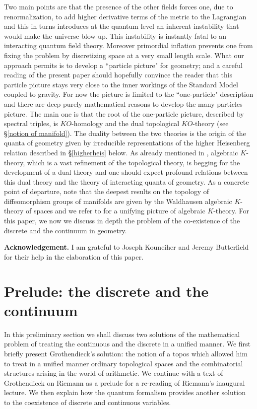 \documentclass[12pt]{article}
\begin{document}
   Two main points are that the presence of the other fields forces one, due to renormalization,  to add higher derivative terms of the metric to the Lagrangian and this in turns introduces at the quantum level an inherent instability  that would make the universe blow up. This instability is instantly fatal to an interacting quantum field theory. Moreover primordial inflation prevents one from fixing the problem by discretizing space at a very small length scale. What our approach permits is to develop a ``particle picture" for geometry; and a careful reading of the present paper should hopefully convince the reader that this particle picture stays very close to the inner workings of the Standard Model coupled to gravity. For now the picture is limited to the ``one-particle" description and there are deep purely mathematical reasons to develop the many particles picture. The main one is that the root of the one-particle picture, described by spectral triples, is $KO$-homology and the dual topological $KO$-theory (see \S \ref{notion of manifold}). The duality between the two theories is the origin of the quanta of geometry given by irreducible representations of the higher Heisenberg relation described in \S \ref{higherheis} below. As already mentioned in \cite{coinaugural}, algebraic $K$-theory, which is a vast refinement of the topological theory,  is begging for the development of a dual theory and one should expect profound relations between this dual theory and the  theory of interacting quanta of geometry. As a concrete point of departure, note that the deepest results on the topology of diffeomorphism groups of manifolds are given by the Waldhausen algebraic $K$-theory of spaces and we refer to \cite{DGM} for a unifying picture of algebraic $K$-theory. For this paper, we now we discuss in depth the problem of the co-existence of the discrete and the continuum in geometry. 

\vspace{0.1in}
{\bf{Acknowledgement.}}
 I am grateful to Joseph Kouneiher and Jeremy Butterfield  for their help in the elaboration of this paper.

\section{Prelude: the discrete and the continuum}
In this preliminary section we shall discuss two solutions  of the mathematical  problem of treating the continuous and the discrete in a unified manner. We first briefly present Grothendieck's solution: the notion of a topos which allowed him to treat in a unified manner ordinary topological spaces and the combinatorial structures arising in the world of arithmetic. We continue with a text of Grothendieck on Riemann as a prelude for  a re-reading of Riemann's inaugural lecture. We then explain how the quantum formalism provides another solution to the coexistence of discrete and continuous variables. 
\end{document}
